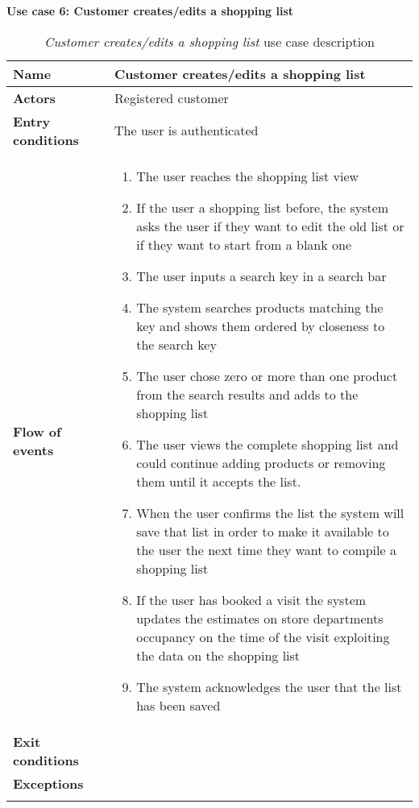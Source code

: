     \clearpage
    \textbf{Use case 6: Customer creates/edits a shopping list}
    \smallskip
    \begin{longtable}{p{0.25\linewidth}p{0.75\linewidth}}
    \toprule
    \textbf{Name} & \textbf{Customer creates/edits a shopping list} \\
    \midrule
    \textbf{Actors} & Registered customer \\
    \midrule
    \textbf{Entry conditions} & The user is authenticated  \\
    \midrule
    \textbf{Flow of events} & 
    \begin{enumerate}
        \item The user reaches the shopping list view 
        \item If the user a shopping list before, the system asks the user if they want to edit the old list or if they want to start from a blank one
        \item The user inputs a search key in a search bar
        \item The system searches products matching the key and shows them ordered by closeness to the search key
        \item The user chose zero or more than one product from the search results and adds to the shopping list
        \item The user views the complete shopping list and could continue adding products or removing them until it accepts the list.
        \item When the user confirms the list the system will save that list in order to make it available to the user the next time they want to compile a shopping list
        \item If the user has booked a visit the system updates the estimates on store departments occupancy on the time of the visit exploiting the data on the shopping list 
        \item The system acknowledges the user that the list has been saved
    \end{enumerate} \\
    \midrule
    \textbf{Exit conditions} &  \\
    \midrule
    \textbf{Exceptions} & \\
    \bottomrule
    \caption{\emph{Customer creates/edits a shopping list} use case description}
    \end{longtable}

